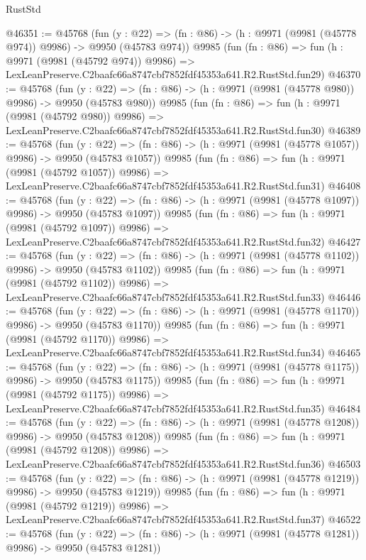 \begin{lexlean}{RustStd}
\begin{coremodule}
@46351 := @45768
    (fun (y : @22) => (fn : @86) -> (h : @9971 (@9981 (@45778 @974)) @9986) -> @9950 (@45783 @974))
    @9985
    (fun (fn : @86) =>
    fun (h : @9971 (@9981 (@45792 @974)) @9986) =>
    LexLeanPreserve.C2baafc66a8747cbf7852fdf45353a641.R2.RustStd.fun29)
@46370 := @45768
    (fun (y : @22) => (fn : @86) -> (h : @9971 (@9981 (@45778 @980)) @9986) -> @9950 (@45783 @980))
    @9985
    (fun (fn : @86) =>
    fun (h : @9971 (@9981 (@45792 @980)) @9986) =>
    LexLeanPreserve.C2baafc66a8747cbf7852fdf45353a641.R2.RustStd.fun30)
@46389 := @45768
    (fun (y : @22) =>
    (fn : @86) -> (h : @9971 (@9981 (@45778 @1057)) @9986) -> @9950 (@45783 @1057))
    @9985
    (fun (fn : @86) =>
    fun (h : @9971 (@9981 (@45792 @1057)) @9986) =>
    LexLeanPreserve.C2baafc66a8747cbf7852fdf45353a641.R2.RustStd.fun31)
@46408 := @45768
    (fun (y : @22) =>
    (fn : @86) -> (h : @9971 (@9981 (@45778 @1097)) @9986) -> @9950 (@45783 @1097))
    @9985
    (fun (fn : @86) =>
    fun (h : @9971 (@9981 (@45792 @1097)) @9986) =>
    LexLeanPreserve.C2baafc66a8747cbf7852fdf45353a641.R2.RustStd.fun32)
@46427 := @45768
    (fun (y : @22) =>
    (fn : @86) -> (h : @9971 (@9981 (@45778 @1102)) @9986) -> @9950 (@45783 @1102))
    @9985
    (fun (fn : @86) =>
    fun (h : @9971 (@9981 (@45792 @1102)) @9986) =>
    LexLeanPreserve.C2baafc66a8747cbf7852fdf45353a641.R2.RustStd.fun33)
@46446 := @45768
    (fun (y : @22) =>
    (fn : @86) -> (h : @9971 (@9981 (@45778 @1170)) @9986) -> @9950 (@45783 @1170))
    @9985
    (fun (fn : @86) =>
    fun (h : @9971 (@9981 (@45792 @1170)) @9986) =>
    LexLeanPreserve.C2baafc66a8747cbf7852fdf45353a641.R2.RustStd.fun34)
@46465 := @45768
    (fun (y : @22) =>
    (fn : @86) -> (h : @9971 (@9981 (@45778 @1175)) @9986) -> @9950 (@45783 @1175))
    @9985
    (fun (fn : @86) =>
    fun (h : @9971 (@9981 (@45792 @1175)) @9986) =>
    LexLeanPreserve.C2baafc66a8747cbf7852fdf45353a641.R2.RustStd.fun35)
@46484 := @45768
    (fun (y : @22) =>
    (fn : @86) -> (h : @9971 (@9981 (@45778 @1208)) @9986) -> @9950 (@45783 @1208))
    @9985
    (fun (fn : @86) =>
    fun (h : @9971 (@9981 (@45792 @1208)) @9986) =>
    LexLeanPreserve.C2baafc66a8747cbf7852fdf45353a641.R2.RustStd.fun36)
@46503 := @45768
    (fun (y : @22) =>
    (fn : @86) -> (h : @9971 (@9981 (@45778 @1219)) @9986) -> @9950 (@45783 @1219))
    @9985
    (fun (fn : @86) =>
    fun (h : @9971 (@9981 (@45792 @1219)) @9986) =>
    LexLeanPreserve.C2baafc66a8747cbf7852fdf45353a641.R2.RustStd.fun37)
@46522 := @45768
    (fun (y : @22) =>
    (fn : @86) -> (h : @9971 (@9981 (@45778 @1281)) @9986) -> @9950 (@45783 @1281))

\end{coremodule}
\end{lexlean}
